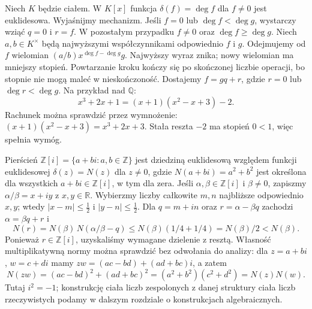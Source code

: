 \begin{przyklad}
\label{aa:prz:polynomial-division}
Niech $K$ będzie ciałem. W $K[x]$ funkcja $\delta(f)=\deg f$
dla $f\ne0$ jest euklidesowa.
Wyjaśnijmy mechanizm. Jeśli $f=0$ lub $\deg f<\deg g$, wystarczy wziąć
$q=0$ i $r=f$. W pozostałym przypadku $f\ne0$ oraz $\deg f\ge\deg g$.
Niech $a,b\in K^\times$ będą najwyższymi współczynnikami
odpowiednio $f$ i $g$. Odejmujemy od $f$ wielomian
$(a/b)x^{\deg f-\deg g}g$.
Najwyższy wyraz znika; nowy wielomian ma mniejszy stopień.
Powtarzanie kroku kończy się po skończonej liczbie operacji,
bo stopnie nie mogą maleć w nieskończoność.
Dostajemy $f=gq+r$, gdzie $r=0$ lub $\deg r<\deg g$.
Na przykład nad $\mathbb Q$:
\[
x^3+2x+1=(x+1)(x^2-x+3)-2.
\]
Rachunek można sprawdzić przez wymnożenie:
$(x+1)(x^2-x+3)=x^3+2x+3$.
Stała reszta $-2$ ma stopień $0<1$, więc spełnia wymóg.
\end{przyklad}

\begin{przyklad}
\label{aa:prz:gaussian-euclidean}
Pierścień $\mathbb Z[i]=\{a+bi:a,b\in\mathbb Z\}$
jest dziedziną euklidesową względem funkcji euklidesowej
$\delta(z)=N(z)$ dla $z\ne0$, gdzie
$N(a+bi)=a^2+b^2$ jest określona dla wszystkich
$a+bi\in\mathbb Z[i]$, w tym dla zera.
Jeśli $\alpha,\beta\in\mathbb Z[i]$ i $\beta\ne0$,
zapiszmy $\alpha/\beta=x+iy$ z $x,y\in\mathbb R$.
Wybierzmy liczby całkowite $m,n$ najbliższe odpowiednio
$x,y$; wtedy $|x-m|\le\tfrac12$ i $|y-n|\le\tfrac12$.
Dla $q=m+in$ oraz $r=\alpha-\beta q$ zachodzi
$\alpha=\beta q+r$ i
\[
N(r)=N(\beta)\,N(\alpha/\beta-q)
\le N(\beta)(1/4+1/4)=N(\beta)/2<N(\beta).
\]
Ponieważ $r\in\mathbb Z[i]$, uzyskaliśmy wymagane dzielenie
z resztą. Własność multiplikatywną normy można sprawdzić
bez odwołania do analizy: dla $z=a+bi$, $w=c+di$
mamy $zw=(ac-bd)+(ad+bc)i$, a zatem
\[
N(zw)=(ac-bd)^2+(ad+bc)^2
=(a^2+b^2)(c^2+d^2)=N(z)N(w).
\]
Tutaj $i^2=-1$; konstrukcję ciała liczb zespolonych
z danej struktury ciała liczb rzeczywistych podamy
w dalszym rozdziale o konstrukcjach algebraicznych.
\end{przyklad}

